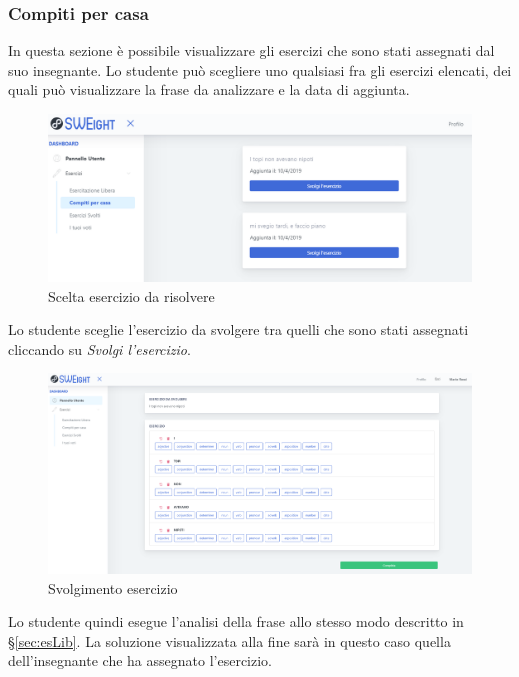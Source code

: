   		\subsubsection{Compiti per casa}
 		  In questa sezione è possibile visualizzare gli esercizi che sono stati assegnati dal suo insegnante. Lo studente può scegliere uno qualsiasi fra gli esercizi elencati, dei quali può visualizzare la frase da analizzare e la data di aggiunta.
        	\begin{figure}[H]
            	\centering
            	\includegraphics[width=17cm]{sez/img/studente/compitopercasa.PNG} 
            	\caption{Scelta esercizio da risolvere}\label{fig:1}
        	\end{figure}

		  Lo studente sceglie l'esercizio da svolgere tra quelli che sono stati assegnati cliccando su \textit{Svolgi l'esercizio}.   
       
        	\begin{figure}[H]
            	\centering
            	\includegraphics[width=17cm]{sez/img/studente/svolgimentoesercizio.PNG} 
            	\caption{Svolgimento esercizio}\label{fig:1}
        	\end{figure}      
	Lo studente quindi esegue l'analisi della frase allo stesso modo descritto in \S\ref{sec:esLib}. La soluzione visualizzata alla fine sarà in questo caso quella dell'insegnante che ha assegnato l'esercizio.
        
